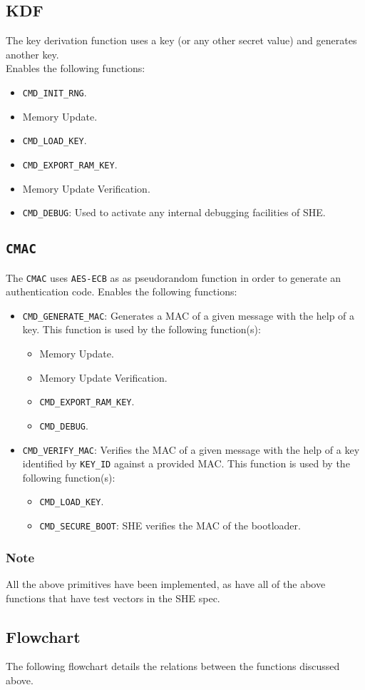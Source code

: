 \documentclass{article}
\begin{document}
	\subsection{KDF}
	The key derivation function uses a key (or any other secret value) and generates another key.\\
		Enables the following functions:
	\begin{itemize}
		\item \texttt{CMD\_INIT\_RNG}.
		\item Memory Update.
		\item \texttt{CMD\_LOAD\_KEY}.
		\item \texttt{CMD\_EXPORT\_RAM\_KEY}. 
		\item Memory Update Verification.
		\item \texttt{CMD\_DEBUG}: Used to activate any internal debugging facilities of SHE. 	
	\end{itemize}
	\subsection{\texttt{CMAC}}
	The \texttt{CMAC} uses \texttt{AES-ECB} as as pseudorandom function in order to generate an authentication code.
	Enables the following functions:
	\begin{itemize}
		\item \texttt{CMD\_GENERATE\_MAC}: Generates a MAC of a given message with the help of a key.  This function is used by the following function(s):
		\begin{itemize}
			\item Memory Update.
			\item Memory Update Verification.
			\item \texttt{CMD\_EXPORT\_RAM\_KEY}. 
			\item \texttt{CMD\_DEBUG}.
		\end{itemize}
		\item \texttt{CMD\_VERIFY\_MAC}: Verifies the MAC of a given message with the help of a key identified by \texttt{KEY\_ID} against a provided MAC. This function is used by the following function(s):
		\begin{itemize}
			\item \texttt{CMD\_LOAD\_KEY}. 
			\item \texttt{CMD\_SECURE\_BOOT}: SHE verifies the MAC of the bootloader.
		\end{itemize}
	\end{itemize}
	\subsubsection*{Note}
	All the above primitives have been implemented, as have all of the above functions that have test vectors in the SHE spec.
	\subsection{Flowchart}
	The following flowchart details the relations between the functions discussed above.
	\newpage
	
\end{document}
